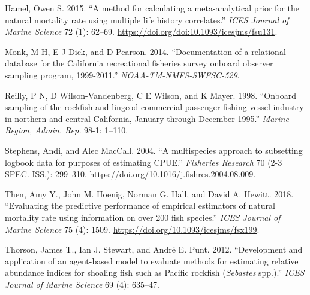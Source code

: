 \documentclass[11pt,
  english,
  a4paper,
]{article}
\newlength{\cslhangindent}
\newenvironment{CSLReferences}[2] %
 {%
  \setlength{\parindent}{0pt}
  \ifodd #1 \everypar{\setlength{\hangindent}{\cslhangindent}}\ignorespaces\fi
  \ifnum #2 > 0
  \setlength{\parskip}{#2\baselineskip}
  \fi
 }%
 {}
\begin{document}
\hypertarget{refs}{}
\begin{CSLReferences}{1}{0}
\leavevmode{}%
Hamel, Owen S. 2015. {``{A method for calculating a meta-analytical prior for the natural mortality rate using multiple life history correlates}.''} \emph{ICES Journal of Marine Science} 72 (1): 62--69. \url{https://doi.org/doi:10.1093/icesjms/fsu131}.

\leavevmode{}%
Monk, M H, E J Dick, and D Pearson. 2014. {``{Documentation of a relational database for the California recreational fisheries survey onboard observer sampling program, 1999-2011}.''} \emph{NOAA-TM-NMFS-SWFSC-529}.

\leavevmode{}%
Reilly, P N, D Wilson-Vandenberg, C E Wilson, and K Mayer. 1998. {``{Onboard sampling of the rockfish and lingcod commercial passenger fishing vessel industry in northern and central California, January through December 1995.}''} \emph{Marine Region, Admin. Rep.} 98-1: 1--110.

\leavevmode{}%
Stephens, Andi, and Alec MacCall. 2004. {``{A multispecies approach to subsetting logbook data for purposes of estimating CPUE}.''} \emph{Fisheries Research} 70 (2-3 SPEC. ISS.): 299--310. \url{https://doi.org/10.1016/j.fishres.2004.08.009}.

\leavevmode{}%
Then, Amy Y., John M. Hoenig, Norman G. Hall, and David A. Hewitt. 2018. {``{Evaluating the predictive performance of empirical estimators of natural mortality rate using information on over 200 fish species}.''} \emph{ICES Journal of Marine Science} 75 (4): 1509. \url{https://doi.org/10.1093/icesjms/fsx199}.

\leavevmode{}%
Thorson, James T., Ian J. Stewart, and André E. Punt. 2012. {``{Development and application of an agent-based model to evaluate methods for estimating relative abundance indices for shoaling fish such as Pacific rockfish (\emph{Sebastes} spp.)}.''} \emph{ICES Journal of Marine Science} 69 (4): 635--47.

\end{CSLReferences}
\end{document}

